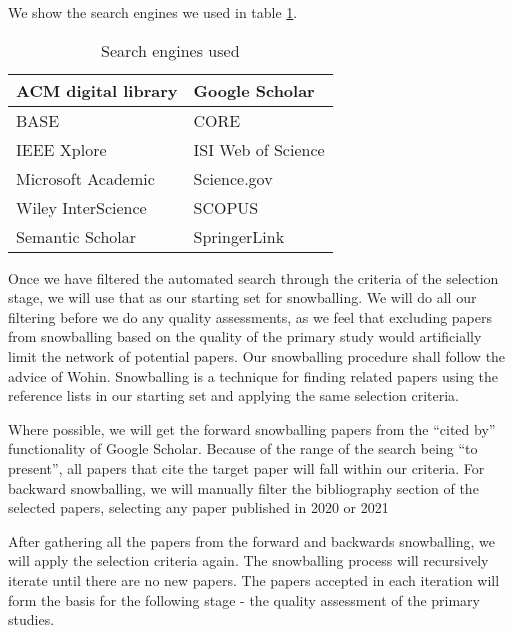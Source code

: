 We show the search engines we used in table \ref{table:searchEngines}.

\begin{table}[h]
    \begin{center}         
        \begin{tabular}{|l||l|}
            \hline
            ACM digital library       & Google Scholar       \\
            \hline
            BASE                      & CORE                 \\
            \hline  
            IEEE Xplore               & ISI Web of Science   \\
            \hline  
            Microsoft Academic        & Science.gov          \\
            \hline  
            Wiley InterScience        & SCOPUS               \\
            \hline  
            Semantic Scholar          & SpringerLink         \\
            \hline  
        \end{tabular}
    \end{center}
    \caption{Search engines used}
    \label{table:searchEngines}
\end{table}

Once we have filtered the automated search through the criteria of the selection stage, we will use that as our starting set for snowballing.
We will do all our filtering before we do any quality assessments, as we feel that excluding papers from snowballing based on the quality of the primary study would artificially limit the network of potential papers.
Our snowballing procedure shall follow the advice of Wohin\cite{Wohlin_2014}.
Snowballing is a technique for finding related papers using the reference lists in our starting set and applying the same selection criteria.

Where possible, we will get the forward snowballing papers from the ``cited by'' functionality of Google Scholar.
Because of the range of the search being ``to present'', all papers that cite the target paper will fall within our criteria.
For backward snowballing, we will manually filter the bibliography section of the selected papers, selecting any paper published in 2020 or 2021

After gathering all the papers from the forward and backwards snowballing, we will apply the selection criteria again.
The snowballing process will recursively iterate until there are no new papers.
The papers accepted in each iteration will form the basis for the following stage - the quality assessment of the primary studies.

